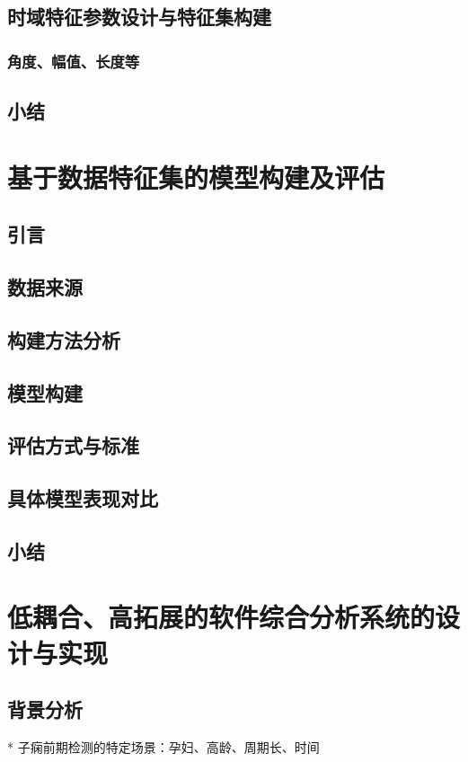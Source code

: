 \section{时域特征参数设计与特征集构建}
\subsection{角度、幅值、长度等}
\section{小结}

\chapter{基于数据特征集的模型构建及评估}
\section{引言}

\section{数据来源}
\section{构建方法分析}
\section{模型构建}
\section{评估方式与标准}
\section{具体模型表现对比}
\section{小结}

\chapter{低耦合、高拓展的软件综合分析系统的设计与实现}
\section{背景分析}
* 子痫前期检测的特定场景：孕妇、高龄、周期长、时间

